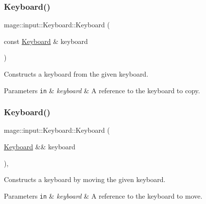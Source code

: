\subsubsection{\texorpdfstring{Keyboard()}{Keyboard()}\hspace{0.1cm}{\footnotesize\ttfamily [2/3]}}
{\footnotesize\ttfamily mage\+::input\+::\+Keyboard\+::\+Keyboard (\begin{DoxyParamCaption}\item[{const \mbox{\hyperlink{classmage_1_1input_1_1_keyboard}{Keyboard}} \&}]{keyboard }\end{DoxyParamCaption})\hspace{0.3cm}{\ttfamily [delete]}}

Constructs a keyboard from the given keyboard.


\begin{DoxyParams}[1]{Parameters}
\mbox{\tt in}  & {\em keyboard} & A reference to the keyboard to copy. \\
\hline
\end{DoxyParams}
\mbox{\label{classmage_1_1input_1_1_keyboard_adb93a42b959d58fc320215157f85854c}} 
\subsubsection{\texorpdfstring{Keyboard()}{Keyboard()}\hspace{0.1cm}{\footnotesize\ttfamily [3/3]}}
{\footnotesize\ttfamily mage\+::input\+::\+Keyboard\+::\+Keyboard (\begin{DoxyParamCaption}\item[{\mbox{\hyperlink{classmage_1_1input_1_1_keyboard}{Keyboard}} \&\&}]{keyboard }\end{DoxyParamCaption})\hspace{0.3cm}{\ttfamily [default]}, {\ttfamily [noexcept]}}

Constructs a keyboard by moving the given keyboard.


\begin{DoxyParams}[1]{Parameters}
\mbox{\tt in}  & {\em keyboard} & A reference to the keyboard to move. \\
\hline
\end{DoxyParams}
\mbox{\label{classmage_1_1input_1_1_keyboard_a71239cd5326f78ab226f145a430b382b}} 
